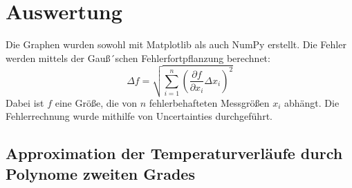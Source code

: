 \section{Auswertung}
\label{sec:Auswertung}

Die Graphen wurden sowohl mit Matplotlib \cite{matplotlib} als auch NumPy \cite{numpy} erstellt. Die Fehler werden mittels der Gauß´schen Fehlerfortpflanzung berechnet:
\begin{equation*}
\Delta f = \sqrt{\sum_{i=1}^n \left(\frac{\partial f}{\partial x_i}\Delta x_i\right)^2}
\end{equation*}
Dabei ist $f$ eine Größe, die von $n$ fehlerbehafteten Messgrößen $x_i$ abhängt.
Die Fehlerrechnung wurde mithilfe von Uncertainties \cite{uncertainties} durchgeführt.

\subsection{Approximation der Temperaturverläufe durch Polynome zweiten Grades}

